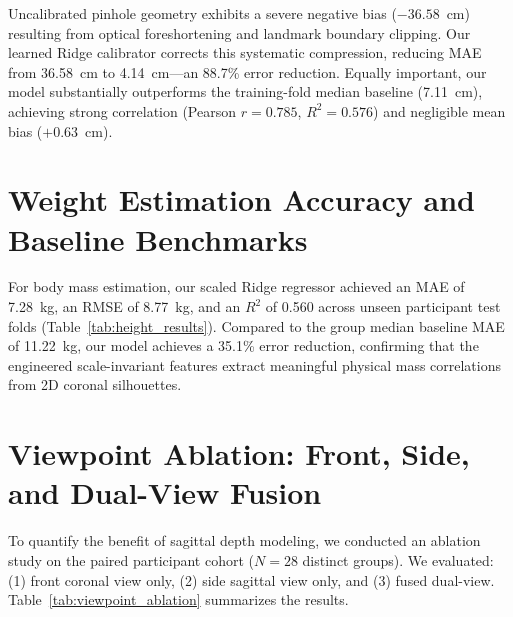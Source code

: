 \documentclass[12pt,a4paper,oneside]{report}
\begin{document}
Uncalibrated pinhole geometry exhibits a severe negative bias ($-36.58$~cm) resulting from optical foreshortening and landmark boundary clipping. Our learned Ridge calibrator corrects this systematic compression, reducing MAE from 36.58~cm to 4.14~cm---an 88.7\% error reduction. Equally important, our model substantially outperforms the training-fold median baseline (7.11~cm), achieving strong correlation (Pearson $r = 0.785$, $R^2 = 0.576$) and negligible mean bias ($+0.63$~cm).

\section{Weight Estimation Accuracy and Baseline Benchmarks}
For body mass estimation, our scaled Ridge regressor achieved an MAE of 7.28~kg, an RMSE of 8.77~kg, and an $R^2$ of 0.560 across unseen participant test folds (Table~\ref{tab:height_results}). Compared to the group median baseline MAE of 11.22~kg, our model achieves a 35.1\% error reduction, confirming that the engineered scale-invariant features extract meaningful physical mass correlations from 2D coronal silhouettes.

\section{Viewpoint Ablation: Front, Side, and Dual-View Fusion}
To quantify the benefit of sagittal depth modeling, we conducted an ablation study on the paired participant cohort ($N=28$ distinct groups). We evaluated: (1) front coronal view only, (2) side sagittal view only, and (3) fused dual-view. Table~\ref{tab:viewpoint_ablation} summarizes the results.

\begin{table}[H]
\centering
\caption{Viewpoint Ablation and Multi-View Fusion Comparison ($N=28$ Paired Groups)}
\label{tab:viewpoint_ablation}
\end{table}
\end{document}
